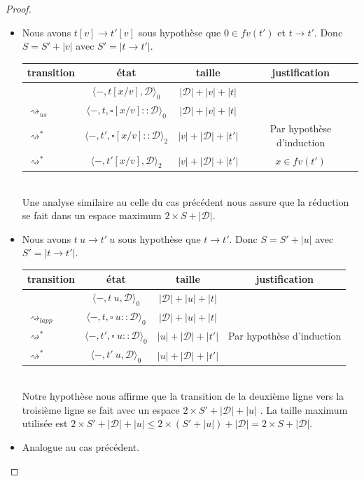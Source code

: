 \documentclass[11pt,a4paper]{article}
\theoremstyle{definition}
\newcommand{\etatz}[1]{\langle #1 \rangle_0}
\newcommand{\etatd}[1]{\langle #1 \rangle_2}
\newcommand{\mcd}{\mathcal{D}}
\newcommand{\mtd}{\mathcal{D}}
\begin{document}
\begin{proof}
\begin{itemize}
    \item {} Nous avons $t[v] \rightarrow t'[v]$ sous hypothèse que $0\in fv(t')$ et  $t\rightarrow t'$. Donc $S = S'+|v|$ avec $S' = | t \rightarrow t'|$.\\
      \begin{tabular}{@{}l c c c@{}}
        \toprule
        transition & état & taille & justification\\
        \midrule
                   & $\etatz{-,t[x/v],\mcd}$ & $|\mcd|+|v|+|t|$\\
        $\rightsquigarrow_{us}$ & $ \etatz{-, t, \square[x/v]:: \mcd}$ & $|\mcd| + |v| +|t|$\\ 
        $\rightsquigarrow^{*}$ & $ \etatd{-, t' ,\square[x/v]::\mcd}$ & $|v| + |\mcd|+|t'|$& Par hypothèse d'induction \\
        $\rightsquigarrow^{*}$ & $ \etatd{-, t'[x/v], \mcd}$ & $|v| + |\mcd|+|t'|$&$x \in fv(t')$\\
        \bottomrule
      \end{tabular}\\
      Une analyse similaire au celle du cas précédent nous assure que la réduction se fait dans un espace maximum $2\times S +|\mtd|$.
    \item {} Nous avons $t~u \rightarrow t'~u$ sous hypothèse que $t\rightarrow t'$. Donc $S = S'+|u|$ avec $S' = | t \rightarrow t'|$.\\
      \begin{tabular}{@{}l c c c@{}}
        \toprule
        transition & état & taille & justification\\
        \midrule
                   & $\etatz{-,t~u,\mtd}$ & $|\mtd|+|u|+|t|$\\
        $\rightsquigarrow_{lapp}$ & $ \etatz{-, t, \square~u:: \mtd}$ & $|\mtd| + |u| +|t|$\\ 
        $\rightsquigarrow^*$ & $ \etatz{-, t' ,\square~u::\mtd}$ & $|u| + |\mtd|+|t'|$& Par hypothèse d'induction\\
        $\rightsquigarrow^*$ & $ \etatz{-, t'~u, \mtd}$ & $|u| + |\mtd|+|t'|$\\
        \bottomrule
      \end{tabular}\\
      Notre hypothèse nous affirme que la transition de la deuxième ligne vers la troisième ligne se fait avec un espace $ 2 \times S' +|\mtd| + |u|$ . 
      La taille maximum utilisée est $2 \times S' +|\mtd|+|u| \le 2 \times (S'+|u|)+|\mtd| = 2 \times S + |\mtd|$.
    \item {} Analogue au cas précédent.
  \end{itemize}
\end{proof}
\end{document}
